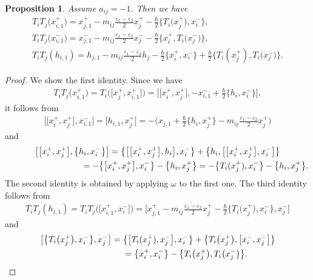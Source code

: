 \documentclass[pdftex]{sigma}
\newtheorem{prop}[thm]{Proposition}
\theoremstyle{definition}
\numberwithin{equation}{section}
\newcommand{\ve}{\varepsilon}
\begin{document}
\begin{prop}\label{prop:iji}Assume $a_{ij}=-1$. Then we have
\begin{gather*}
T_i T_j \big(x_{i,1}^+\big) = x_{j,1}^+ - m_{ij}\tfrac{\ve_1 - \ve_2}{2}x_j^+ - \tfrac{\hbar}{2}\big\{T_i\big(x_j^+\big),x_i^-\big\}, \\
T_i T_j \big(x_{i,1}^-\big) = x_{j,1}^- - m_{ij}\tfrac{\ve_1 - \ve_2}{2}x_j^- - \tfrac{\hbar}{2}\big\{x_i^+,T_i\big(x_j^-\big)\big\}, \\
T_i T_j (h_{i,1}) = h_{j,1} - m_{ij}\tfrac{\ve_1 - \ve_2}{2}h_j - \tfrac{\hbar}{2}\{x_i^+,x_i^-\} + \tfrac{\hbar}{2}\big\{T_i(x_j^+),T_i\big(x_j^-\big)\big\}.
\end{gather*}
\end{prop}
\begin{proof}We show the first identity. Since we have
\begin{gather*}
T_iT_j\big(x_{i,1}^+\big) = T_i\big(\big[x_{j}^+,x_{i,1}^+\big]\big) = \big[\big[x_i^+,x_j^+\big],-x_{i,1}^-+\tfrac{\hbar}{2}\big\{h_i,x_i^{-}\big\}\big],
\end{gather*}
it follows from
\begin{gather*}
\big[\big[x_i^+,x_j^+\big],x_{i,1}^-\big] = \big[h_{i,1},x_j^+\big] = -\big( x_{j,1} + \tfrac{\hbar}{2}\big\{h_i,x_j^{+}\big\} - m_{ij} \tfrac{\ve_1 - \ve_2}{2}x_j^+ \big)
\end{gather*}
and
\begin{gather*}
\big[\big[x_i^+,x_j^+\big],\big\{h_i,x_i^{-}\big\}\big]= \big\{\big[\big[x_i^+,x_j^+\big],h_i\big],x_i^-\big\} + \big\{h_i,\big[\big[x_i^+,x_j^+\big],x_i^-\big]\big\} \\
 \hphantom{\big[\big[x_i^+,x_j^+\big],\big\{h_i,x_i^{-}\big\}\big]}{} = -\big\{\big[x_i^+,x_j^+\big],x_i^-\big\} - \big\{h_i,x_j^{+}\big\} = -\big\{T_i(x_j^+),x_i^-\big\} - \big\{h_i,x_j^{+}\big\}.
\end{gather*}
The second identity is obtained by applying $\omega$ to the first one. The third identity follows from
\begin{gather*}
T_iT_j(h_{i,1})= T_iT_j\big(\big[x_{i,1}^+,x_{i}^-\big]\big) = \big[x_{j,1}^+-m_{ij}\tfrac{\ve_1-\ve_2}{2}x_j^+-\tfrac{\hbar}{2}\big\{T_i\big(x_j^+\big),x_i^-\big\},x_j^-\big]
\end{gather*}
and
\begin{gather*}
\big[\big\{T_i\big(x_j^+\big),x_i^-\big\},x_j^-\big] = \big\{\big[T_i(x_j^+),x_j^-\big],x_i^-\big\} + \big\{T_i\big(x_j^+\big),\big[x_i^-,x_j^-\big]\big\}\\
\hphantom{\big[\big\{T_i\big(x_j^+\big),x_i^-\big\},x_j^-\big]}{} = \big\{x_i^+,x_i^-\big\} - \big\{T_i\big(x_j^+\big),T_i\big(x_j^-\big)\big\}.\tag*{\qed}
\end{gather*}\renewcommand{\qed}{}
\end{proof}
\end{document}
